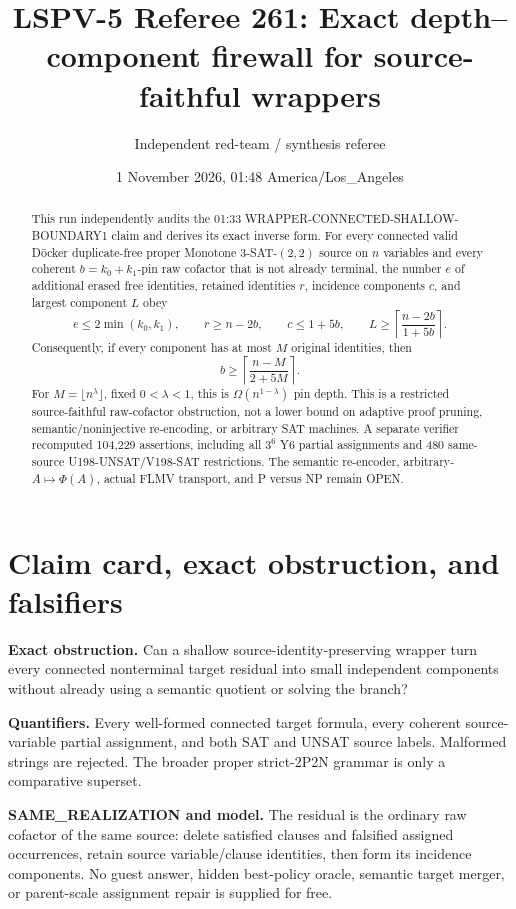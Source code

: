 \documentclass[11pt]{article}
\title{LSPV-5 Referee 261: Exact depth--component firewall for source-faithful wrappers}
\author{Independent red-team / synthesis referee}
\date{1 November 2026, 01:48 America/Los\_Angeles}
\newcommand{\status}[1]{\textsf{#1}}
\begin{document}
\maketitle

\begin{abstract}
This run independently audits the 01:33 WRAPPER-CONNECTED-SHALLOW-BOUNDARY1 claim and derives its exact inverse form.  For every connected valid D\"ocker duplicate-free proper Monotone 3-SAT-$(2,2)$ source on $n$ variables and every coherent $b=k_0+k_1$-pin raw cofactor that is not already terminal, the number $e$ of additional erased free identities, retained identities $r$, incidence components $c$, and largest component $L$ obey
\[
 e\le2\min(k_0,k_1),\qquad r\ge n-2b,
 \qquad c\le1+5b,
 \qquad L\ge\left\lceil\frac{n-2b}{1+5b}\right\rceil.
\]
Consequently, if every component has at most $M$ original identities, then
\[
 b\ge \left\lceil\frac{n-M}{2+5M}\right\rceil.
\]
For $M=\lfloor n^\lambda\rfloor$, fixed $0<\lambda<1$, this is $\Omega(n^{1-\lambda})$ pin depth.  This is a restricted source-faithful raw-cofactor obstruction, not a lower bound on adaptive proof pruning, semantic/noninjective re-encoding, or arbitrary SAT machines.  A separate verifier recomputed 104,229 assertions, including all $3^6$ Y6 partial assignments and 480 same-source U198-UNSAT/V198-SAT restrictions.  The semantic re-encoder, arbitrary-$A\mapsto\Phi(A)$, actual FLMV transport, and P versus NP remain \status{OPEN}.
\end{abstract}

\section{Claim card, exact obstruction, and falsifiers}
\textbf{Exact obstruction.} Can a shallow source-identity-preserving wrapper turn every connected nonterminal target residual into small independent components without already using a semantic quotient or solving the branch?

\textbf{Quantifiers.} Every well-formed connected target formula, every coherent source-variable partial assignment, and both SAT and UNSAT source labels.  Malformed strings are rejected.  The broader proper strict-2P2N grammar is only a comparative superset.

\textbf{SAME\_REALIZATION and model.} The residual is the ordinary raw cofactor of the same source: delete satisfied clauses and falsified assigned occurrences, retain source variable/clause identities, then form its incidence components.  No guest answer, hidden best-policy oracle, semantic target merger, or parent-scale assignment repair is supplied for free.
\end{document}
